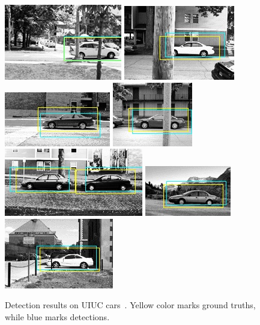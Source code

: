 \begin{figure}
\includegraphics[scale=0.75]{test-24_good.jpg}
\includegraphics[scale=0.75]{test-29_good.jpg}
\includegraphics[scale=0.75]{test-2_good.jpg}
\includegraphics[scale=0.75]{test-31_good.jpg}
\includegraphics[scale=0.75]{test-3_good.jpg}
\includegraphics[scale=0.75]{test-5_good.jpg}
\includegraphics[scale=0.75]{test-8_good.jpg}


\caption[Detection Results on UIUC cars]{Detection results on UIUC cars~\cite{cds}. Yellow color marks ground truths, while blue marks detections.}
\label{fig:c5r}
\end{figure}

